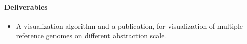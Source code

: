 \paragraph{Deliverables}
\begin{itemize}
\item A visualization algorithm and a publication, for visualization of multiple reference genomes on different abstraction scale.
\end{itemize}














